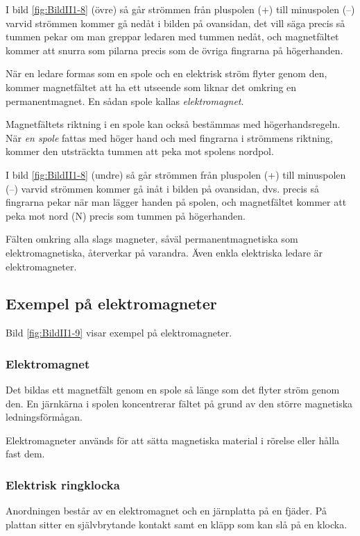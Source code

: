 \begin{multicols}{2}
I bild \ref{fig:BildII1-8} (övre) så går strömmen från pluspolen (+) till
minuspolen (--) varvid strömmen kommer gå nedåt i bilden på ovansidan,
det vill säga precis så tummen pekar om man greppar ledaren med tummen nedåt,
och magnetfältet kommer att snurra som pilarna precis som de övriga fingrarna
på högerhanden.

När en ledare formas som en spole och en elektrisk ström flyter genom den,
kommer magnetfältet att ha ett utseende som liknar det omkring en
permanentmagnet.
En sådan spole kallas \emph{elektromagnet}.

Magnetfältets riktning i en spole kan också bestämmas med högerhandsregeln.
När \emph{en spole} fattas med höger hand och med fingrarna i strömmens
riktning, kommer den utsträckta tummen att peka mot spolens nordpol.

I bild \ref{fig:BildII1-8} (undre) så går strömmen från pluspolen (+) till
minuspolen (--) varvid strömmen kommer gå inåt i bilden på ovansidan, dvs.
precis så fingrarna pekar när man lägger handen på spolen, och magnetfältet
kommer att peka mot nord (N) precis som tummen på högerhanden.

Fälten omkring alla slags magneter, såväl permanentmagnetiska som
elektromagnetiska, återverkar på varandra.
Även enkla elektriska ledare är elektromagneter.

\subsection{Exempel på elektromagneter}


Bild \ref{fig:BildII1-9} visar exempel på elektromagneter.

\subsubsection{Elektromagnet}
Det bildas ett magnetfält genom en spole så länge som det flyter ström genom
den.
En järnkärna i spolen koncentrerar fältet på grund av den större magnetiska
ledningsförmågan.

Elektromagneter används för att sätta magnetiska material i rörelse eller hålla
fast dem.

\subsubsection{Elektrisk ringklocka}
Anordningen består av en elektromagnet och en järnplatta på en fjäder.
På plattan sitter en självbrytande kontakt samt en kläpp som kan slå på en
klocka.


\end{multicols}
